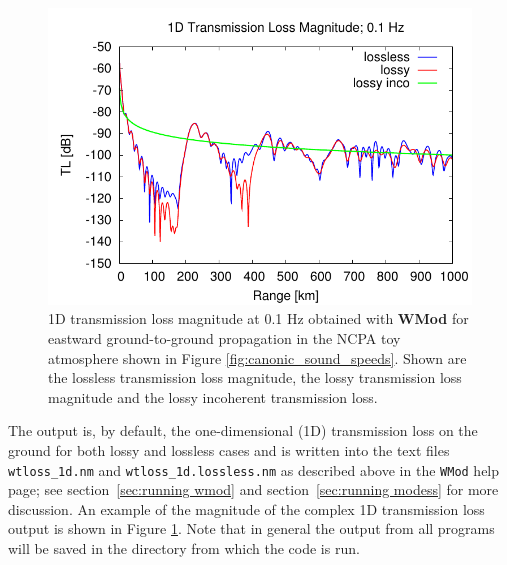 \begin{figure}
\begin{center}
\includegraphics[scale=0.60]{figs/modess_ex1}
\end{center}
\caption{1D transmission loss magnitude at 0.1 Hz obtained with \textbf{WMod} for eastward ground-to-ground propagation in the NCPA toy atmosphere shown in Figure \ref{fig:canonic_sound_speeds}. Shown are the lossless transmission loss magnitude, the lossy transmission loss magnitude and the lossy incoherent transmission loss.}
\label{fig: wmod 1D tl}
\end{figure}

The output is, by default, the one-dimensional (1D) transmission loss on the ground for both lossy and lossless cases and is written into the text files \verb+wtloss_1d.nm+ and \verb+wtloss_1d.lossless.nm+ as described above in the \verb+WMod+ help page; see section~\ref{sec:running wmod} and section~\ref{sec:running modess} for more discussion.  An example of the magnitude of the complex 1D transmission loss output is shown in Figure \ref{fig: wmod 1D tl}. Note that in general the output from all programs will be saved in the directory from which the code is run.  

